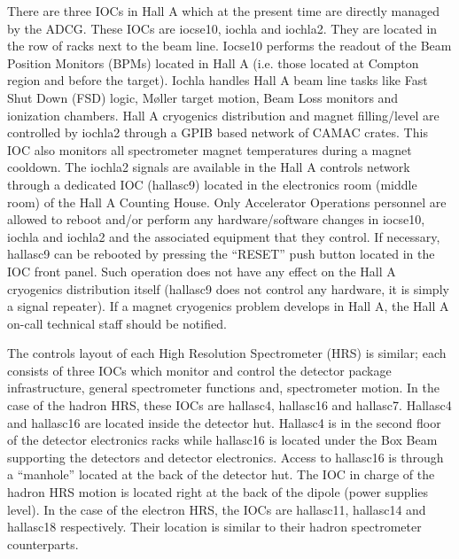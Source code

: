 There are three IOCs in Hall A which at the present time are directly managed by the ADCG.
These IOCs are iocse10, iochla and iochla2. They are located in the row of racks next 
to the beam line. Iocse10 performs the readout of the Beam Position Monitors (BPMs)
located in Hall A (i.e. those located at Compton region and before the target).
Iochla handles Hall A beam line tasks like Fast Shut Down (FSD) logic,
M{\o}ller target motion, Beam Loss monitors and ionization chambers.
Hall A cryogenics distribution and magnet filling/level are controlled by iochla2
through a GPIB based network of CAMAC crates. This IOC also monitors all
spectrometer magnet temperatures during a magnet cooldown.
The iochla2 signals are available in the Hall A controls
network through a dedicated IOC (hallasc9) located in the electronics room (middle room) of the
Hall A Counting House.
Only Accelerator Operations personnel are allowed to reboot and/or perform any hardware/software changes in 
iocse10, iochla and iochla2 and the associated equipment that they control.
If necessary, hallasc9 can be rebooted by pressing the ``RESET'' push button located in the IOC front panel.
Such operation does not have any effect on the Hall A cryogenics distribution itself (hallasc9 does not
control any hardware, it is simply a signal repeater).
If a magnet cryogenics problem develops in Hall A, the Hall A on-call technical staff should be notified.

The controls layout of each High Resolution Spectrometer (HRS) is similar; each consists of three IOCs
which monitor and control the detector package infrastructure, general spectrometer functions 
and, spectrometer motion. In the case of the hadron HRS, these IOCs are hallasc4, hallasc16 and hallasc7. Hallasc4
and hallasc16 are located inside the detector hut. Hallasc4 is in the second floor of the detector electronics racks while
hallasc16 is located under the Box Beam supporting the detectors and detector electronics. Access to hallasc16 is
through a ``manhole''
located at the back of the detector hut. The IOC in charge of the hadron HRS
motion is located right at the back of the dipole (power supplies level). In the case of the electron HRS, the IOCs are
hallasc11, hallasc14 and hallasc18 respectively. Their location is similar to their hadron spectrometer counterparts.

